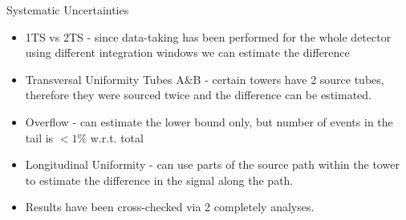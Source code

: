\documentclass[pdf, 9pt]{beamer}
\begin{document}
  \begin{frame}{Systematic Uncertainties}
    \begin{itemize}
      \item 1TS vs 2TS - since data-taking has been performed for the whole detector using different integration windows we can estimate the difference
      \item Transversal Uniformity Tubes A\&B - certain towers have 2 source tubes, therefore they were sourced twice and the difference can be estimated.
      \item Overflow - can estimate the lower bound only, but number of events in the tail is $< 1\%$ w.r.t. total
      \item Longitudinal Uniformity - can use parts of the source path within the tower to estimate the difference in the signal along the path.
      \item Results have been cross-checked via 2 completely analyses.
    \end{itemize}
  \end{frame}
\end{document}
